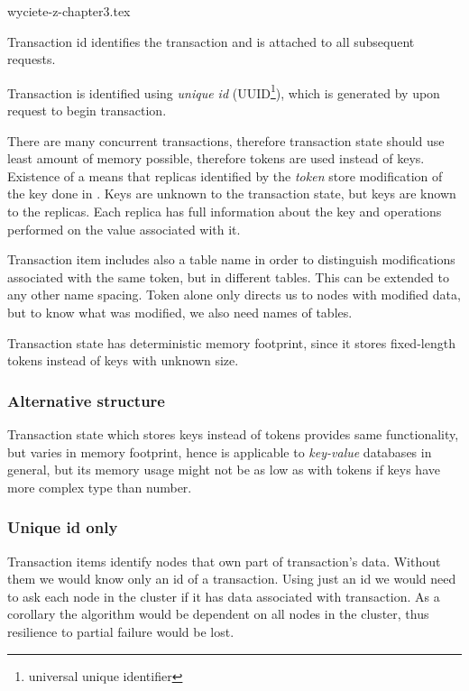 wyciete-z-chapter3.tex

Transaction id identifies the transaction and is attached to all subsequent requests. 

Transaction \transaction is identified using \emph{unique id} (UUID\footnote{universal unique identifier}), which is generated by  upon request to begin transaction. 

There are many concurrent transactions, therefore transaction state should use least amount of memory possible, therefore tokens are used instead of keys. Existence of a \txItem means that replicas identified by the \emph{token} store modification of the key done in \transaction. Keys are unknown to the transaction state, but keys are known to the replicas. Each replica has full information about the key and operations performed on the value associated with it. 

Transaction item includes also a table name in order to distinguish modifications associated with the same token, but in different tables. This can be extended to any other name spacing.
Token alone only directs us to nodes with modified data, but to know what was modified, we also need names of tables. 

Transaction state has deterministic memory footprint, since it stores fixed-length tokens instead of keys with unknown size. 


\subsubsection{Alternative structure}
Transaction state which stores keys instead of tokens provides same functionality, but varies in memory footprint, hence \mpt is applicable to \emph{key-value} databases in general, but its memory usage might not be as low as with tokens if keys have more complex type than number.

\subsubsection{Unique id only}
Transaction items identify nodes that own part of transaction's data. Without them we would know only an id of a transaction.
Using just an id we would need to ask each node in the cluster if it has data associated with transaction. As a corollary the algorithm would be dependent on all nodes in the cluster, thus resilience to partial failure would be lost.

